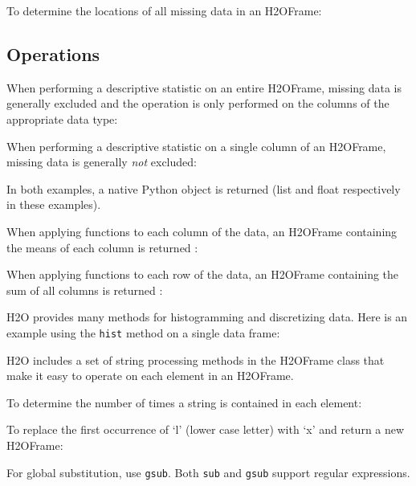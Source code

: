 {\newpage
To determine the locations of all missing data in an H2OFrame:


\subsection{Operations}
When performing a descriptive statistic on an entire H2OFrame, missing data is generally excluded
and the operation is only performed on the columns of the appropriate data type:


\newpage
When performing a descriptive statistic on a single column of an H2OFrame, missing data is generally 
\textit{not} excluded:


In both examples,  a native Python object is returned (list and float respectively
in these examples).

When applying functions to each column of the data, an H2OFrame containing the means of each column is returned :


When applying functions to each row of the data, an H2OFrame containing the sum of all columns is returned :


\newpage
H2O provides many methods for histogramming and discretizing data.
Here is an example using the {\texttt{hist}} method on a single data frame:


H2O includes a set of string processing methods in the H2OFrame class
that make it easy to operate on each element in an H2OFrame.  

To determine the number of times a string is contained in each element:


To replace the first occurrence of `l' (lower case letter) with `x' and return a new H2OFrame:


For global substitution, use {\texttt{gsub}}.  Both {\texttt{sub}} and {\texttt{gsub}} support regular expressions.

}
